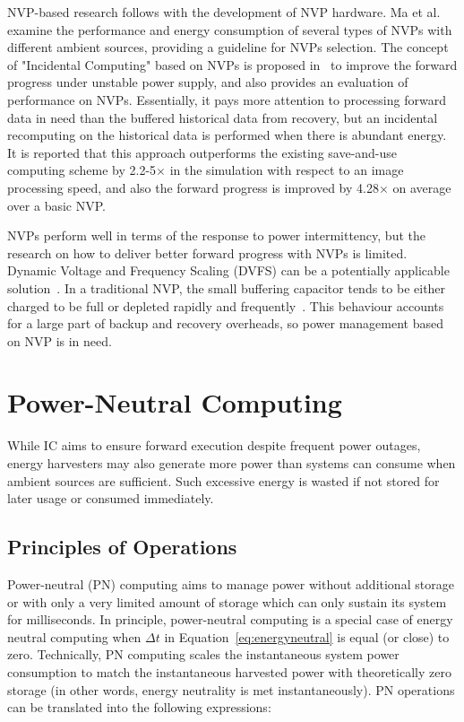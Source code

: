 NVP-based research follows with the development of NVP hardware. Ma et al.~\cite{ma2015architecture} examine the performance and energy consumption of several types of NVPs with different ambient sources, providing a guideline for NVPs selection. The concept of "Incidental Computing" based on NVPs is proposed in~\cite{ma2017incidental} to improve the forward progress under unstable power supply, and also provides an evaluation of performance on NVPs. Essentially, it pays more attention to processing forward data in need than the buffered historical data from recovery, but an incidental recomputing on the historical data is performed when there is abundant energy. It is reported that this approach outperforms the existing save-and-use computing scheme by 2.2-5$\times$ in the simulation with respect to an image processing speed, and also the forward progress is improved by 4.28$\times$ on average over a basic NVP.

NVPs perform well in terms of the response to power intermittency, but the research on how to deliver better forward progress with NVPs is limited. Dynamic Voltage and Frequency Scaling (DVFS) can be a potentially applicable solution~\cite{ma2016nonvolatile}. In a traditional NVP, the small buffering capacitor tends to be either charged to be full or depleted rapidly and frequently~\cite{su2017nonvolatile}. This behaviour accounts for a large part of backup and recovery overheads, so power management based on NVP is in need.

\section{Power-Neutral Computing} \label{Section:PN}

While IC aims to ensure forward execution despite frequent power outages, energy harvesters may also generate more power than systems can consume when ambient sources are sufficient. Such excessive energy is wasted if not stored for later usage or consumed immediately. 

\subsection{Principles of Operations}

Power-neutral (PN) computing aims to manage power without additional storage or with only a very limited amount of storage which can only sustain its system for milliseconds. In principle, power-neutral computing is a special case of energy neutral computing when $\Delta t$ in Equation~\ref{eq:energyneutral} is equal (or close) to zero. Technically, PN computing scales the instantaneous system power consumption to match the instantaneous harvested power with theoretically zero storage (in other words, energy neutrality is met instantaneously). PN operations can be translated into the following expressions:

